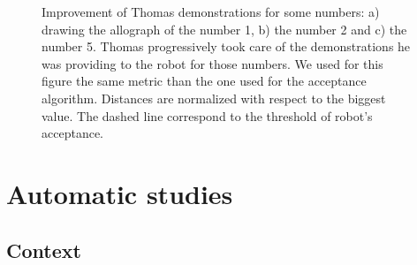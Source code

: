 \documentclass{sig-alternate}
\begin{document}
\begin{figure}
    \centering
    \caption{\small Improvement of Thomas demonstrations for some numbers: a) drawing the allograph of the number 1, b) the number 2 and c) the number 5. Thomas progressively took care of the demonstrations he was providing to the robot for those numbers. We used for this figure the same metric than the one used for the acceptance algorithm. Distances are normalized with respect to the biggest value. The dashed line correspond to the threshold of robot's acceptance.}

    \label{Thomas_progress}
\end{figure}

\section{Automatic studies}\label{auto}

\subsection{Context}
\end{document}
